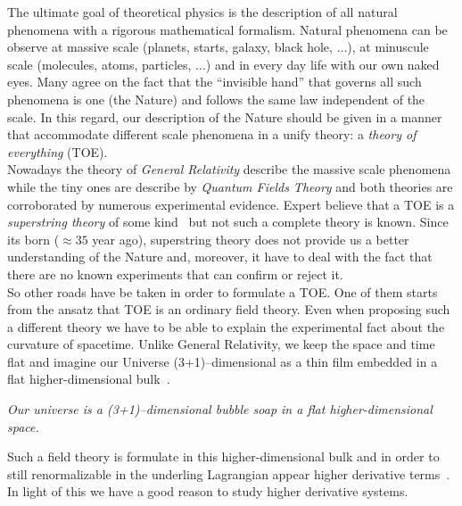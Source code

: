 The ultimate goal of theoretical physics is the description of all natural
phenomena with a rigorous mathematical formalism. Natural phenomena can be
observe at massive scale (planets, starts, galaxy, black hole, $\dots$),
at minuscule scale (molecules, atoms, particles, $\dots$) and in every day life
with our own naked eyes. Many agree on the fact that the ``invisible
hand'' that governs all such phenomena is one (the Nature) and follows the
same law independent of the scale. In this regard, our description of the Nature
should be given in a manner that accommodate different scale phenomena in a
unify theory: a \emph{theory of everything} (TOE). \\

Nowadays the theory of \emph{General Relativity} describe the massive scale
phenomena while the tiny ones are describe by \emph{Quantum Fields Theory} and
both theories are corroborated by numerous experimental evidence. Expert believe
that a TOE is a \emph{superstring theory} of some kind~\cite{Smilga17} but not
such a complete theory is known. Since its born ($\approx 35$ year ago),
superstring theory does not provide us a better understanding of the Nature and,
moreover, it have to deal with the fact that there are no known experiments that
can confirm or reject it. \\

So other roads have be taken in order to formulate a TOE\@. One of them starts
from the ansatz that TOE is an ordinary field theory. Even when proposing such a
different theory we have to be able to explain the experimental fact about the
curvature of spacetime. Unlike General Relativity, we keep the space and time
flat and imagine our Universe (3+1)--dimensional as a thin film embedded in a
flat higher-dimensional bulk~\cite{Smilga17}.

\begin{displayquote}
  \emph{Our universe is a (3+1)--dimensional bubble soap in a flat
  higher-dimensional space.}
\end{displayquote}

Such a field theory is formulate in this higher-dimensional bulk and in order to
still renormalizable in the underling Lagrangian appear higher derivative
terms~\cite{Smilga17}. In light of this we have a good reason to study higher
derivative systems.
